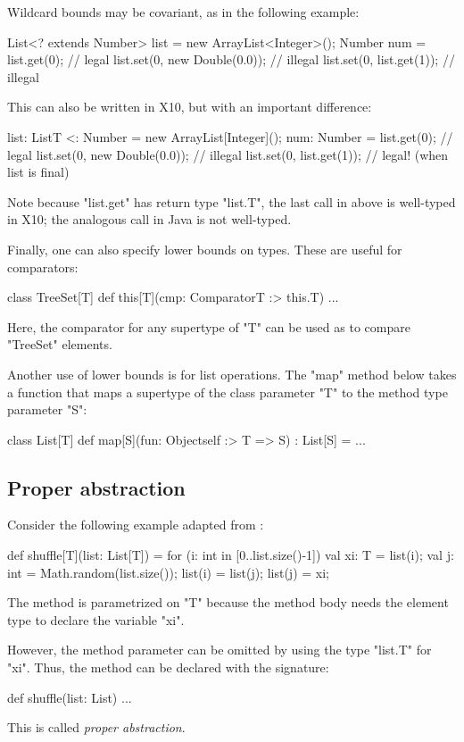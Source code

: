 \documentclass[preprint,nocopyrightspace,9pt]{sigplanconf}
\begin{document}
Wildcard bounds may be covariant, as in the following example:
\begin{xten}
List<? extends Number> list = new ArrayList<Integer>();
Number num = list.get(0);     // legal
list.set(0, new Double(0.0)); // illegal
list.set(0, list.get(1));     // illegal
\end{xten}
This can also be written in X10, but with an important
difference:
\begin{xten}
list: List{T <: Number} = new ArrayList[Integer]();
num: Number = list.get(0);    // legal
list.set(0, new Double(0.0)); // illegal
list.set(0, list.get(1));     // legal! (when list is final)
\end{xten}
Note because \xcd"list.get" has return type \xcd"list.T", the
last call in above is well-typed in X10; the analogous call in
Java is not well-typed.

Finally,
one can also specify lower bounds on types.  These are useful for
comparators:
\begin{xten}
class TreeSet[T] {
    def this[T](cmp: Comparator{T :> this.T}) { ... }
}
\end{xten}
Here, the comparator for any supertype of \xcd"T" can be used as
to compare \xcd"TreeSet" elements.

Another use of lower bounds is for list operations.
The \xcd"map" method below takes a function that maps a supertype
of the class parameter \xcd"T" to the method type parameter \xcd"S":
\begin{xten}
class List[T] {
    def map[S](fun: Object{self :> T} => S) : List[S] = { ... }
}
\end{xten}

\subsection{Proper abstraction}

Consider the following example adapted from \cite{adding-wildcards}:
\begin{xten}
def shuffle[T](list: List[T]) = {
    for (i: int in [0..list.size()-1]) {
        val xi: T = list(i);
        val j: int = Math.random(list.size());
        list(i) = list(j);
        list(j) = xi;
    }
}
\end{xten}
The method is parametrized on \xcd"T" because the method body needs
the element type to declare the variable \xcd"xi".

However, the method parameter can be omitted by using the type \xcd"list.T"
for \xcd"xi".  Thus, the method can be declared with the signature:
\begin{xten}
def shuffle(list: List) { ... }
\end{xten}
This is called \emph{proper abstraction}.
\end{document}
